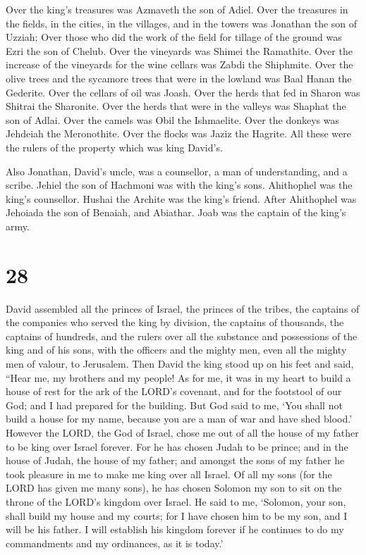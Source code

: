  Over the king's treasures was Azmaveth the son of Adiel.
Over the treasures in the fields, in the cities, in the villages, and in
the towers was Jonathan the son of Uzziah;  Over those
who did the work of the field for tillage of the ground was Ezri the son
of Chelub.  Over the vineyards was Shimei the Ramathite.
Over the increase of the vineyards for the wine cellars was Zabdi the
Shiphmite.  Over the olive trees and the sycamore trees
that were in the lowland was Baal Hanan the Gederite. Over the cellars
of oil was Joash.  Over the herds that fed in Sharon was
Shitrai the Sharonite. Over the herds that were in the valleys was
Shaphat the son of Adlai.  Over the camels was Obil the
Ishmaelite. Over the donkeys was Jehdeiah the Meronothite. Over the
flocks was Jaziz the Hagrite.  All these were the rulers
of the property which was king David's.

 Also Jonathan, David's uncle, was a counsellor, a man of
understanding, and a scribe. Jehiel the son of Hachmoni was with the
king's sons.  Ahithophel was the king's counsellor.
Hushai the Archite was the king's friend.  After
Ahithophel was Jehoiada the son of Benaiah, and Abiathar. Joab was the
captain of the king's army.

\hypertarget{section-27}{%
\section{28}\label{section-27}}

 David assembled all the princes of Israel, the princes of
the tribes, the captains of the companies who served the king by
division, the captains of thousands, the captains of hundreds, and the
rulers over all the substance and possessions of the king and of his
sons, with the officers and the mighty men, even all the mighty men of
valour, to Jerusalem.  Then David the king stood up on his
feet and said, ``Hear me, my brothers and my people! As for me, it was
in my heart to build a house of rest for the ark of the LORD's covenant,
and for the footstool of our God; and I had prepared for the building.
 But God said to me, `You shall not build a house for my
name, because you are a man of war and have shed blood.' 
However the LORD, the God of Israel, chose me out of all the house of my
father to be king over Israel forever. For he has chosen Judah to be
prince; and in the house of Judah, the house of my father; and amongst
the sons of my father he took pleasure in me to make me king over all
Israel.  Of all my sons (for the LORD has given me many
sons), he has chosen Solomon my son to sit on the throne of the LORD's
kingdom over Israel.  He said to me, `Solomon, your son,
shall build my house and my courts; for I have chosen him to be my son,
and I will be his father.  I will establish his kingdom
forever if he continues to do my commandments and my ordinances, as it
is today.'

